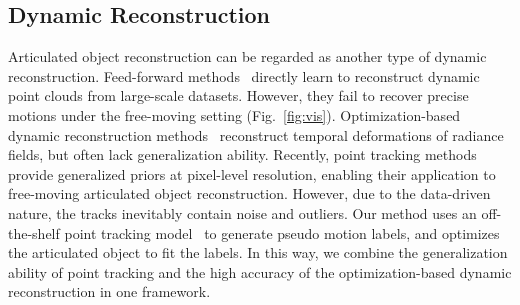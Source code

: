 \subsection{Dynamic Reconstruction}
Articulated object reconstruction can be regarded as another type of dynamic reconstruction. Feed-forward methods~\cite{zhang2024monst3r,lu2025align3r,wang2025continuous} directly learn to reconstruct dynamic point clouds from large-scale datasets. However, they fail to recover precise motions under the free-moving setting (Fig.~\ref{fig:vis}). 
Optimization-based dynamic reconstruction methods~\cite{wu20244d,cao2023hexplane,huang2024sc,lin2024gaussian} reconstruct temporal deformations of radiance fields, but often lack generalization ability. Recently, point tracking methods~\cite{alltracker,tapip3d,xiao2025spatialtrackerv2,rajivc2025multi,ngodelta,yao2025uni4d} provide generalized priors at pixel-level resolution, enabling their application to free-moving articulated object reconstruction. However, due to the data-driven nature, the tracks inevitably contain noise and outliers. Our method uses an off-the-shelf point tracking model~\cite{alltracker} to generate pseudo motion labels, and optimizes the articulated object to fit the labels. In this way, we combine the generalization ability of point tracking and the high accuracy of the optimization-based dynamic reconstruction in one framework.